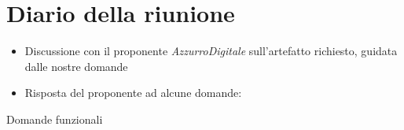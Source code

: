 \section{Diario della riunione}

\begin{itemize}
    \item Discussione con il proponente \emph{AzzurroDigitale} sull'artefatto richiesto, guidata dalle nostre domande
    \item Risposta del proponente ad alcune domande:
\end{itemize}

\vspace{0.5cm}

\begingroup
\renewcommand{\ni}{\noindent}

  {\Large Domande funzionali}

  \vspace{0.5cm}

